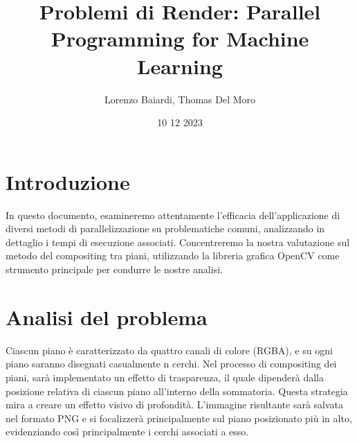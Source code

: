 \documentclass[11pt]{article}
\title{Problemi di Render: Parallel Programming for Machine Learning}
\author{Lorenzo Baiardi, Thomas Del Moro}
\date{10 12 2023}
\begin{document}
    \maketitle
    \clearpage

    \section{Introduzione}\label{sec:introduzione}
    In questo documento, esamineremo attentamente l'efficacia dell'applicazione di diversi metodi di parallelizzazione
    su problematiche comuni, analizzando in dettaglio i tempi di esecuzione associati.
    Concentreremo la nostra valutazione sul metodo del compositing tra piani, utilizzando la libreria grafica OpenCV
    come strumento principale per condurre le nostre analisi.

    \section{Analisi del problema}\label{sec:analisi-del-problema}
    Ciascun piano è caratterizzato da quattro canali di colore (RGBA), e su ogni piano saranno disegnati casualmente n cerchi.
    Nel processo di compositing dei piani, sarà implementato un effetto di trasparenza, il quale dipenderà dalla
    posizione relativa di ciascun piano all'interno della sommatoria.
    Questa strategia mira a creare un effetto visivo di profondità.
    L'immagine risultante sarà salvata nel formato PNG e si focalizzerà principalmente sul piano posizionato più in alto,
    evidenziando così principalmente i cerchi associati a esso.
\end{document}
